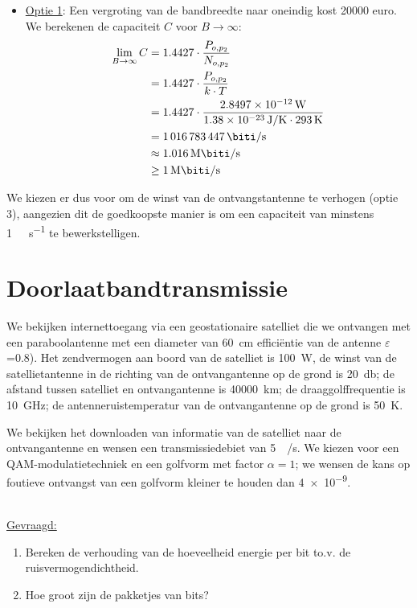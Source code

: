 \documentclass[kulak]{kulakarticle}
\let\epsilon\varepsilon
\begin{document}
\begin{itemize}
		\item \underline{Optie 1}: Een vergroting van de bandbreedte naar oneindig kost 20000 euro. We berekenen de capaciteit \(C\) voor \(B \to \infty\): \begin{align*}
			\lim_{B\to\infty} C &= 1.4427 \cdot \frac{P_{o,p_2}}{N_{o,p_2}}\\
			&= 1.4427 \cdot \frac{P_{o,p_2}}{k \cdot T}\\
			&= 1.4427 \cdot \frac{\SI{2.8497e-12}{\watt}}{\SI{1.38e-23}{\joule/\kelvin}
				 \cdot \SI{293}{\kelvin}}\\
			&= \SI{1016783447}{\biti\per\second}\\
			&\approx \SI{1.016}{\mega\biti\per\second}\\
			&\geq \SI{1}{\mega\biti\per\second}
		\end{align*}
	\end{itemize}

	We kiezen er dus voor om de winst van de ontvangstantenne te verhogen (optie 3), aangezien dit de goedkoopste manier is om een capaciteit van minstens \SI{1}{\mega\biti\per\second} te bewerkstelligen.

	\newpage
	\section{Doorlaatbandtransmissie}

	We bekijken internettoegang via een geostationaire satelliet die we ontvangen met een paraboolantenne met een diameter van \SI{60}{\centi\meter} efficiëntie van de antenne \(\epsilon\)=0.8). Het zendvermogen aan boord van de satelliet is \SI{100}{\watt}, de winst van de satellietantenne in de richting van de ontvangantenne op de grond is \SI{20}{\decibel}; de afstand tussen satelliet en ontvangantenne is \SI{40000}{\kilo\meter}; de draaggolffrequentie is \SI{10}{\giga\hertz}; de antenneruistemperatur van de ontvangantenne op de grond is \SI{50}{\kelvin}.

	We bekijken het downloaden van informatie van de satelliet naar de ontvangantenne en wensen een transmissiedebiet van \SI{5}{\mega\bit/\second}. We kiezen voor een QAM-modulatietechniek en een golfvorm met factor \(\alpha=1\); we wensen de kans op foutieve ontvangst van een golfvorm kleiner te houden dan \SI{4e-9}{}.

	\hfill \\
	\underline{Gevraagd:}
	\begin{enumerate}
		\item Bereken de verhouding van de hoeveelheid energie per bit to.v. de ruisvermogendichtheid.
		\item Hoe groot zijn de pakketjes van bits?
	\end{enumerate}
\end{document}
